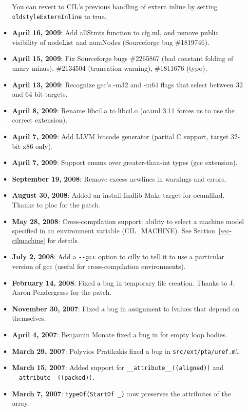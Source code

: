 \documentclass[letterpaper]{article}
\def\secref#1{Section~\ref{sec-#1}}
\def\moduleref#1{\ahref{api/#1.html}{#1}}
\def\t#1{{\tt #1}}
\begin{document}
\begin{itemize}
  You can revert to CIL's previous handling of extern inline by setting
  \t{oldstyleExternInline} to true.
\item {\bf April 16, 2009}: Add allStmts function to cfg.ml, and
  remove public visibility of nodeList and numNodes (Sourceforge bug
  \#1819746).
\item {\bf April 15, 2009}: Fix Sourceforge bugs \#2265867 (bad constant
  folding of unary minus), \#2134504 (truncation warning), \#1811676 (typo).
\item {\bf April 13, 2009}: Recognize gcc's -m32 and -m64 flags that select
  between 32 and 64 bit targets.
\item {\bf April 8, 2009}: Rename libcil.a to libcil.o (ocaml 3.11 forces
  us to use the correct extension).
\item {\bf April 7, 2009}: Add LLVM bitcode generator (partial C support, target
  32-bit x86 only).
\item {\bf April 7, 2009}: Support enums over greater-than-int types (gcc
  extension).
\item {\bf September 19, 2008}: Remove excess newlines in warnings and errors.
\item {\bf August 30, 2008}: Added an install-findlib Make target for
  ocamlfind.  Thanks to ploc for the patch.
\item {\bf May 28, 2008}: Cross-compilation support: ability to
  select a machine model specified in an environment variable (CIL\_MACHINE).
  See \secref{cilmachine} for details.
\item {\bf July 2, 2008}: Add a \t{-{}-gcc} option to cilly to tell it to use
  a particular version of gcc (useful for cross-compilation environments).
\item {\bf February 14, 2008}: Fixed a bug in temporary file
  creation.  Thanks to J. Aaron Pendergrass for the patch.
\item {\bf November 30, 2007}: Fixed a bug in assignment to lvalues that
      depend on themselves.
\item {\bf April 4, 2007}: Benjamin Monate fixed a bug in
  \moduleref{Cfg} for empty loop bodies.
\item {\bf March 29, 2007}: Polyvios Pratikakis fixed a bug in 
  \t{src/ext/pta/uref.ml}.
\item {\bf March 15, 2007}: Added support for
  \t{\_\_attribute\_\_((aligned))} and
  \t{\_\_attribute\_\_((packed))}.
\item {\bf March 7, 2007}: \t{typeOf(StartOf \_)} now preserves the
  attributes of the array.

\end{itemize}
\end{document}
